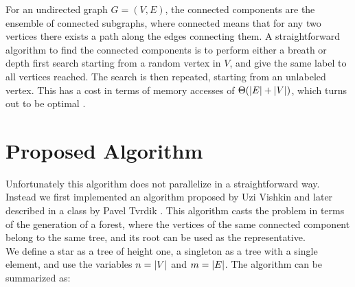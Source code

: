 %

For an undirected graph $G=(V,E)$, the connected components are the ensemble
of connected subgraphs, where connected means that for any two vertices there exists a path along
the edges connecting them.
A straightforward algorithm to find the connected components is to perform either
a breath or depth first search starting from a random vertex in $V$,
and give the same label to all vertices reached. The search is then repeated, starting from an
unlabeled vertex.
This has a cost in terms of memory accesses of $\Theta(\left| E \right| + \left| V \right|)$, which turns out
to be optimal \cite{Hopcroft}.

\section{Proposed Algorithm}\label{sec:yourmethod}
%
%


Unfortunately this algorithm does not parallelize in a straightforward
way. Instead we first implemented
an algorithm proposed by Uzi Vishkin \cite{PCompPaper} and later described in a class by Pavel
Tvrdik \cite{PCompClass}. This algorithm casts the problem in terms of the generation of a
forest, where the vertices of the same connected component belong to the same tree, and its root
can be used as the representative.\\
We define a star as a tree of height one, a singleton as a tree with a single element, and
use the variables $n=\left| V \right|$ and $m=\left| E \right|$.
The algorithm can be summarized as:

